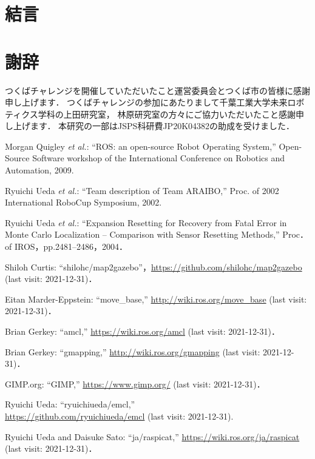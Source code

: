 \documentclass[twocolumn,9pt]{jsproceedings}
\begin{document}
\section{結言}

\section*{謝辞}
つくばチャレンジを開催していただいたこと運営委員会とつくば市の皆様に感謝申し上げます．
つくばチャレンジの参加にあたりまして千葉工業大学未来ロボティクス学科の上田研究室，
林原研究室の方々にご協力いただいたこと感謝申し上げます．
本研究の一部はJSPS科研費JP20K04382の助成を受けました．

\footnotesize
\begin{thebibliography}{99}
	  Morgan Quigley {\it et al.}: ``ROS: an open-source Robot Operating System,'' 
Open-Source Software workshop of the International Conference on Robotics and Automation, 2009. 

	Ryuichi Ueda {\it et al.}: 
``Team description of Team ARAIBO,'' 
Proc. of 2002 International RoboCup Symposium, 2002. 

	Ryuichi Ueda {\it et al.}: 
  ``Expansion Resetting for Recovery from Fatal Error in Monte Carlo Localization -- Comparison with Sensor Resetting Methods,'' Proc．of IROS，pp.2481--2486，2004．
  
  Shiloh Curtis: ``shilohc/map2gazebo''，\url{https://github.com/shilohc/map2gazebo} (last visit: 2021-12-31)．
  
  Eitan Marder-Eppstein: ``move\_base,'' \url{http://wiki.ros.org/move_base} (last visit: 2021-12-31)．
  
  Brian Gerkey: ``amcl,'' \url{https://wiki.ros.org/amcl} (last visit: 2021-12-31)．

  Brian Gerkey: ``gmapping,'' \url{http://wiki.ros.org/gmapping} (last visit: 2021-12-31)．
  
  GIMP.org: ``GIMP,'' \url{https://www.gimp.org/} (last visit: 2021-12-31)．
  
  Ryuichi Ueda: ``ryuichiueda/emcl,''\\\url{https://github.com/ryuichiueda/emcl} (last visit: 2021-12-31).
  
  Ryuichi Ueda and Daisuke Sato: ``ja/raspicat,'' \url{https://wiki.ros.org/ja/raspicat} (last visit: 2021-12-31)．
  

\end{thebibliography}
\end{document}
